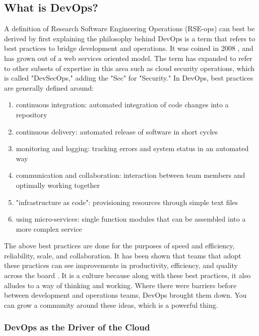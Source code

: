 \subsection{What is DevOps?}

A definition of Research Software Engineering Operations (RSE-ops) can best be derived by first explaining the philosophy behind DevOps \cite{aws} is a term that refers to best practices to bridge development and operations. It was coined in 2008 \cite{devops-paper}, and has grown out of a web services oriented model. The term has expanded to refer to other subsets of expertise in this area such as cloud security operations, which is called "DevSecOps," adding the "Sec" for "Security." In DevOps, best practices are generally defined around:

\begin{enumerate}
\item continuous integration: automated integration of code changes into a repository
\item continuous delivery: automated release of software in short cycles
\item monitoring and logging: tracking errors and system status in an automated way
\item communication and collaboration: interaction between team members and optimally working together
\item "infrastructure as code": provisioning resources through simple text files
\item using micro-services: single function modules that can be assembled into a more complex service
\end{enumerate}


The above best practices are done for the purposes of speed and efficiency, reliability, scale, and collaboration. It has been shown that teams that adopt these practices can see improvements in productivity, efficiency, and quality across the board \cite{devops-changed-things}. It is a culture because along with these best practices, it also alludes to a way of thinking and working. Where there were barriers before between development and operations teams, DevOps brought them down. You can grow a community around these ideas, which is a powerful thing. 

\subsubsection{DevOps as the Driver of the Cloud}

